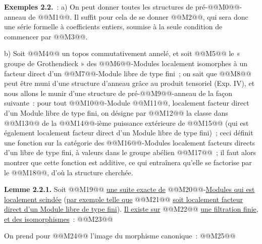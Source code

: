
\textbf{Exemples 2.2.}~: a) On peut donner toutes les structures de pré-@@M0@@-anneau de @@M1@@. Il suffit pour cela de se donner @@M2@@, qui sera donc une série formelle à coefficients entiers, soumise à la seule condition de commencer par @@M3@@.

b) Soit @@M4@@ un topos commutativement annelé, et soit @@M5@@ le « groupe de Grothendieck » des @@M6@@-Modules localement isomorphes à un facteur direct d'un @@M7@@-Module libre de type fini~; on sait que @@M8@@ peut être muni d'une structure d'anneau grâce au produit tensoriel (Exp. IV), et nous allons le munir d'une structure de pré-@@M9@@-anneau de la façon suivante~: pour tout @@M10@@-Module @@M11@@, localement facteur direct d'un Module libre de type fini, on désigne par @@M12@@ la classe dans @@M13@@ de la @@M14@@-ième puissance extérieure de @@M15@@ (qui est également localement facteur direct d'un Module libre de type fini)~; ceci définit une fonction sur la catégorie des @@M16@@-Modules localement facteurs directs d'un libre de type fini, à valeurs dans le groupe abélien @@M17@@~; il faut alors montrer que cette fonction est additive, ce qui entraînera qu'elle se factorise par le @@M18@@, d'où la structure cherchée.

\textbf{Lemme 2.2.1.} Soit @@M19@@ \uline{une suite exacte de} @@M20@@-\uline{Modules qui est localement scindée} (\uline{par exemple telle que} @@M21@@ \uline{soit localement facteur direct d'un Module libre de type fini}). \uline{Il existe sur} @@M22@@ \uline{une filtration finie}, \uline{et des isomorphismes}~:
@@M23@@

On prend pour @@M24@@ l'image du morphisme canonique~:
@@M25@@
